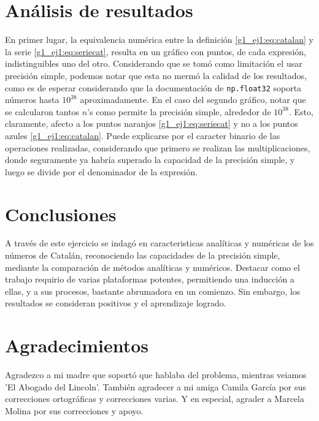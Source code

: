 \documentclass[../portafolio.tex]{subfiles}
\begin{document}
\section{Análisis de resultados}
En primer lugar, la equivalencia numérica entre la definición \eqref{g1_ej1:eq:catalan} y la serie \eqref{g1_ej1:eq:seriecat}, resulta en un gráfico con puntos, de cada expresión, indistinguibles uno del otro. Considerando que se tomó como limitación el usar precisión simple, podemos notar que esta no mermó la calidad de los resultados, como es de esperar considerando que la documentación \citep{IEEE754-2008} de \texttt{np.float32} soporta números hasta $10^{38}$ aproximadamente.
En el caso del segundo gráfico, notar que se calcularon tantos $n$'s como permite la precisión simple, alrededor de $10^{38}$. Esto, claramente, afecto a los puntos naranjos \eqref{g1_ej1:eq:seriecat} y no a los puntos azules \eqref{g1_ej1:eq:catalan}. Puede explicarse por el caracter binario de las operaciones realizadas, considerando que primero se realizan las multiplicaciones, donde seguramente ya habría superado la capacidad de la precisión simple, y luego se divide por el denominador de la expresión. 

\section*{Conclusiones}
A través de este ejercicio se indagó en caracteristicas analíticas y numéricas de los números de Catalán, reconociendo las capacidades de la precisión simple, mediante la comparación de métodos analíticas y numéricos. Destacar como el trabajo requirio de  varias plataformas potentes, permitiendo una inducción a ellas, y a sus procesos, bastante abrumadora en un comienzo. Sin embargo, los resultados se consideran positivos y el aprendizaje logrado.

\section*{Agradecimientos}
Agradezco a mi madre que soportó que hablaba del problema, mientras veiamos  'El Abogado del Lincoln'. También agradecer a mi amiga Camila García por sus correcciones ortográficas y correcciones varias. Y en especial, agrader a Marcela Molina por sus correcciones y apoyo.
\end{document}
